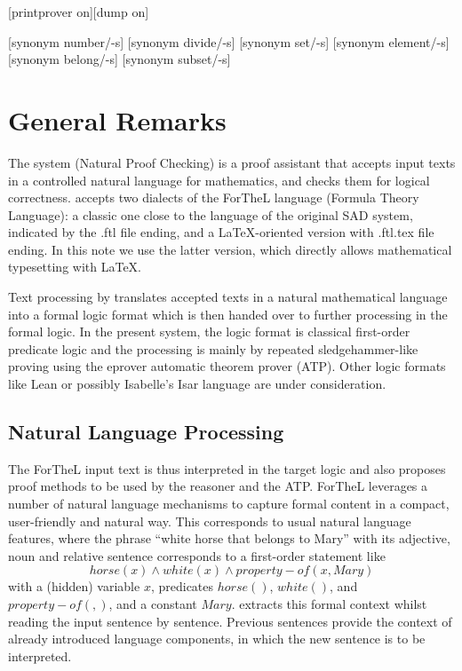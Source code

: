 \documentclass[11pt]{article}
\begin{document}
\begin{forthel}

[printprover on][dump on]

[synonym number/-s]
[synonym divide/-s]
[synonym set/-s] [synonym element/-s]
[synonym belong/-s] [synonym subset/-s]

\end{forthel}

\section{General Remarks}

The \Naproche system (Natural Proof Checking)
is a proof assistant that
accepts input texts
in a controlled natural language for mathematics, and checks
them for logical correctness. \Naproche accepts
two dialects of the ForTheL language (Formula Theory Language):
a classic one close to the language of the original SAD system,
indicated by the .ftl file ending,
and a LaTeX-oriented version with .ftl.tex file ending.
In this note we use the latter version, which directly allows
mathematical typesetting with \LaTeX.

Text processing by \Naproche translates accepted texts in a natural
mathematical language into a formal logic format which is
then handed over to further processing in the formal logic.
In the present \Naproche system, the logic format is classical
first-order predicate logic and the processing is mainly by
repeated sledgehammer-like proving using the eprover automatic
theorem prover (ATP).
Other logic formats like Lean or possibly Isabelle's Isar
language are under consideration.

\subsection{Natural Language Processing}

The ForTheL input text is thus interpreted in the target logic
and also proposes proof methods to be used by the reasoner
and the ATP. ForTheL leverages a number of natural language
mechanisms to capture formal content in a compact, user-friendly
and natural way. This corresponds to usual natural language
features, where the phrase ``white horse that belongs
to Mary'' with its adjective, noun and relative sentence
corresponds to a first-order statement like
$$horse(x) \wedge white(x) \wedge property-of(x,Mary)$$
with a (hidden) variable $x$, predicates $horse()$,
$white()$, and $property-of( , )$, and a constant $Mary$.
\Naproche extracts this formal context whilst reading
the input sentence by sentence. Previous sentences provide the context
of already introduced language components, in which the
new sentence is to be interpreted.
\end{document}
